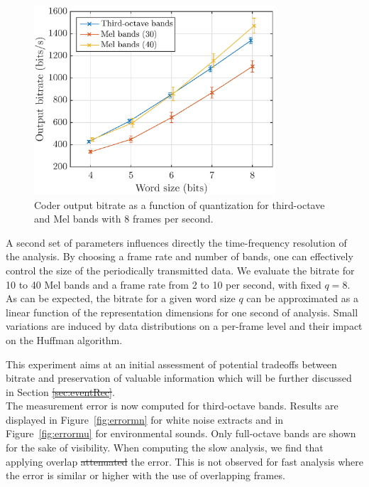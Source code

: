 \documentclass[sensors,article,submit,moreauthors,pdftex,10pt,a4paper]{mdpi}
\providecommand{\DIFaddtex}[1]{{\protect\color{blue}\uwave{#1}}} %
\providecommand{\DIFdeltex}[1]{{\protect\color{red}\sout{#1}}}                      %
\providecommand{\DIFaddbegin}{} %
\providecommand{\DIFaddend}{} %
\providecommand{\DIFdelbegin}{} %
\providecommand{\DIFdelend}{} %
\providecommand{\DIFadd}[1]{\texorpdfstring{\DIFaddtex{#1}}{#1}} %
\providecommand{\DIFdel}[1]{\texorpdfstring{\DIFdeltex{#1}}{}} %
\begin{document}
\begin{figure}[htbp]
	\centering
		\includegraphics[width=0.8\textwidth]{figures/bitrate_qall.eps}
	\caption{Coder output bitrate as a function of quantization for third-octave and Mel bands with 8 frames per second.}
	\label{fig:bitrate_q}
\end{figure}

A second set of parameters influences directly the time-frequency resolution of the analysis. By choosing a frame rate and number of bands, one can effectively control the size of the periodically transmitted data. We evaluate the bitrate for 10 to 40 Mel bands and a frame rate from 2 to 10 per second, with fixed $q = 8$. As can be expected, the bitrate for a given word size $q$ can be approximated as a linear function of the representation dimensions for one second of analysis. Small variations are induced by data distributions on a per-frame level and their impact on the Huffman algorithm.

This experiment aims at an initial assessment of potential tradeoffs between bitrate and preservation of valuable information which will be further discussed in Section \DIFdelbegin \DIFdel{\ref{sec:eventRec}}\DIFdelend \DIFaddbegin \DIFadd{\ref{sec:event_r}}\DIFaddend .\\

The measurement error is now computed for third-octave bands. Results are displayed in Figure~\ref{fig:errormn} for white noise extracts and in Figure~\ref{fig:errormu} for environmental sounds. Only full-octave bands are shown for the sake of visibility. When computing the slow analysis, we find that applying overlap \DIFdelbegin \DIFdel{attenuated }\DIFdelend \DIFaddbegin \DIFadd{attenuates }\DIFaddend the error. This is not observed for fast analysis where the error is similar or higher with the use of overlapping frames.
\end{document}
